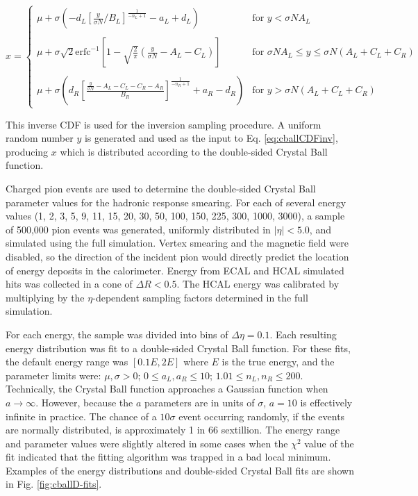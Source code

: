 \begin{equation}
x = \begin{cases}
\mu + \sigma \left(-d_{L}\left[\frac{y}{\sigma N}/B_{L}\right]^{\frac{1}{-n_{L}+1}}-a_{L}+d_{L} \right) & \text{for $y < \sigma N A_{L}$} \\
\\
\mu + \sigma \sqrt{2} \text{erfc}^{-1}\left[1-\sqrt{\frac{2}{\pi}}\left(\frac{y}{\sigma N}-A_{L}-C_{L}\right)\right] & \text{for $\sigma N A_{L} \leq y \leq \sigma N (A_{L} + C_{L} + C_{R})$} \\
\\
\mu + \sigma \left(d_{R}\left[\frac{\frac{y}{\sigma N} - A_{L} - C_{L} - C_{R} - A_{R}}{B_{R}}\right]^{\frac{1}{-n_{R}+1}}+a_{R}-d_{R}\right) & \text{for $y > \sigma N (A_{L} + C_{L} + C_{R})$}
\end{cases}
\label{eq:cballCDFinv}
\end{equation}

This inverse CDF is used for the inversion sampling procedure. A uniform random number $y$ is generated and used as the input to Eq. \eqref{eq:cballCDFinv}, producing $x$ which is distributed according to the double-sided Crystal Ball function.

Charged pion events are used to determine the double-sided Crystal Ball parameter values for the hadronic response smearing. For each of several energy values (1, 2, 3, 5, 9, 11, 15, 20, 30, 50, 100, 150, 225, 300, 1000, 3000\GeV), a sample of 500,000 pion events was generated, uniformly distributed in $|\eta|<5.0$, and simulated using the full simulation. Vertex smearing and the magnetic field were disabled, so the direction of the incident pion would directly predict the location of energy deposits in the calorimeter. Energy from ECAL and HCAL simulated hits was collected in a cone of $\Delta R < 0.5$. The HCAL energy was calibrated by multiplying by the $\eta$-dependent sampling factors determined in the full simulation.

For each energy, the sample was divided into bins of $\Delta \eta = 0.1$. Each resulting energy distribution was fit to a double-sided Crystal Ball function. For these fits, the default energy range was $[0.1E,2E]$ where $E$ is the true energy, and the parameter limits were: $\mu, \sigma > 0$; $0 \leq a_{L}, a_{R} \leq 10$; $1.01 \leq n_{L}, n_{R} \leq 200$. Technically, the Crystal Ball function approaches a Gaussian function when $a \rightarrow \infty$. However, because the $a$ parameters are in units of $\sigma$, $a = 10$ is effectively infinite in practice. The chance of a $10\sigma$ event occurring randomly, if the events are normally distributed, is approximately 1 in 66 sextillion. The energy range and parameter values were slightly altered in some cases when the $\chi^{2}$ value of the fit indicated that the fitting algorithm was trapped in a bad local minimum. Examples of the energy distributions and double-sided Crystal Ball fits are shown in Fig. \ref{fig:cballD-fits}.


